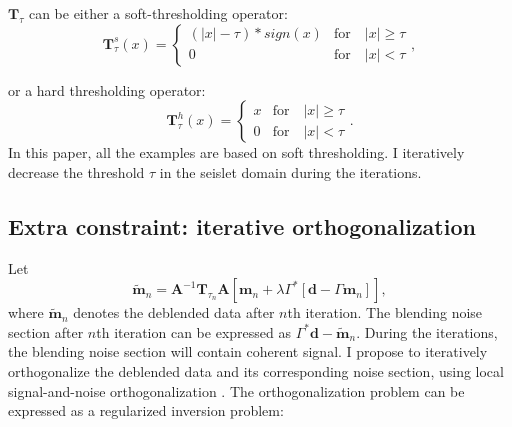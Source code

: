 $\mathbf{T}_{\tau}$ can be either a soft-thresholding operator:
\begin{equation}
\label{eq:soft}
\mathbf{T}^s_{\tau}(x) = \left\{ \begin{array}{ll} (|x|-\tau)*sign(x) &\text{for} \quad |x|\ge\tau \\
0 &\text{for} \quad |x|<\tau
\end{array}\right.,
\end{equation}

or a hard thresholding operator:
\begin{equation}
\label{eq:hard}
\mathbf{T}^h_{\tau}(x) = \left\{ \begin{array}{ll} x &\text{for} \quad |x|\ge\tau \\
0 &\text{for} \quad |x|<\tau
\end{array}\right. .
\end{equation}
In this paper, all the examples are based on soft thresholding. I iteratively decrease the threshold $\tau$ in the seislet domain during the iterations. 

\subsection{Extra constraint: iterative orthogonalization}
Let
\begin{equation}
\label{eq:tildem}
\tilde{\mathbf{m}}_n=\mathbf{A}^{-1}\mathbf{T}_{\tau_n}\mathbf{A}[\mathbf{m}_n+\lambda\Gamma^*[\mathbf{d}-\Gamma\mathbf{m}_n]],
\end{equation}
where $\tilde{\mathbf{m}}_n$ denotes the deblended data after $n$th iteration. The blending noise section after $n$th iteration can be expressed as $\Gamma^*\mathbf{d}-\tilde{\mathbf{m}}_n$. During the iterations, the blending noise section will contain coherent signal. I propose to iteratively orthogonalize the deblended data and its corresponding noise section, using local signal-and-noise orthogonalization \cite{yangkang2015ortho}. The orthogonalization problem can be expressed as a regularized inversion problem:

